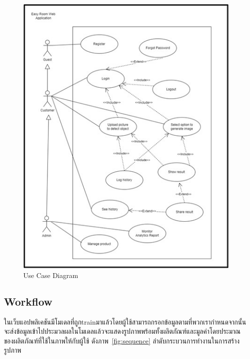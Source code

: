 \documentclass[12pt,oneside,openright,a4paper]{cpe-thai-project}
\begin{document}
\begin{figure}[!h]\centering
\includegraphics{image/use-case.jpg}
\caption{Use Case Diagram}
\label{fig:use-case}
\end{figure}

\vspace{\fill}\clearpage

\subsection{Workflow}
\hspace {18pt}ในเว็บแอปพลิเคชันมีโมเดลที่ถูกtrainมาแล้วโดยผู้ใช้สามารถกรอกข้อมูลตามที่พวกเรากำหนดจากนั้นจะส่งข้อมูลเข้าไปประมวลผลในโมเดลแล้วจะแสดงรูปภาพพร้อมทั้งผลิตภัณฑ์และมูลค่าโดยประมาณของผลิตภัณฑ์ที่ใช้ในภาพให้กับผู้ใช้ ดังภาพ~\ref{fig:sequence} ลำดับกระบวนการทำงานในการสร้างรูปภาพ 
\end{document}
